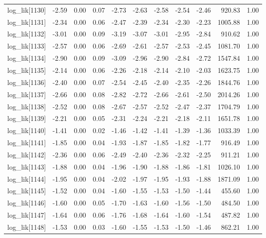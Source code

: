 \begin{table}[ht]
\begin{tabular}{rrrrrrrrrrr}
  log\_lik[1130] & -2.59 & 0.00 & 0.07 & -2.73 & -2.63 & -2.58 & -2.54 & -2.46 & 920.83 & 1.00 \\ 
  log\_lik[1131] & -2.34 & 0.00 & 0.06 & -2.47 & -2.39 & -2.34 & -2.30 & -2.23 & 1005.88 & 1.00 \\ 
  log\_lik[1132] & -3.01 & 0.00 & 0.09 & -3.19 & -3.07 & -3.01 & -2.95 & -2.84 & 910.62 & 1.00 \\ 
  log\_lik[1133] & -2.57 & 0.00 & 0.06 & -2.69 & -2.61 & -2.57 & -2.53 & -2.45 & 1081.70 & 1.00 \\ 
  log\_lik[1134] & -2.90 & 0.00 & 0.09 & -3.09 & -2.96 & -2.90 & -2.84 & -2.72 & 1547.84 & 1.00 \\ 
  log\_lik[1135] & -2.14 & 0.00 & 0.06 & -2.26 & -2.18 & -2.14 & -2.10 & -2.03 & 1623.75 & 1.00 \\ 
  log\_lik[1136] & -2.40 & 0.00 & 0.07 & -2.54 & -2.45 & -2.40 & -2.35 & -2.26 & 1844.76 & 1.00 \\ 
  log\_lik[1137] & -2.66 & 0.00 & 0.08 & -2.82 & -2.72 & -2.66 & -2.61 & -2.50 & 2014.26 & 1.00 \\ 
  log\_lik[1138] & -2.52 & 0.00 & 0.08 & -2.67 & -2.57 & -2.52 & -2.47 & -2.37 & 1704.79 & 1.00 \\ 
  log\_lik[1139] & -2.21 & 0.00 & 0.05 & -2.31 & -2.24 & -2.21 & -2.18 & -2.11 & 1651.78 & 1.00 \\ 
  log\_lik[1140] & -1.41 & 0.00 & 0.02 & -1.46 & -1.42 & -1.41 & -1.39 & -1.36 & 1033.39 & 1.00 \\ 
  log\_lik[1141] & -1.85 & 0.00 & 0.04 & -1.93 & -1.87 & -1.85 & -1.82 & -1.77 & 916.49 & 1.00 \\ 
  log\_lik[1142] & -2.36 & 0.00 & 0.06 & -2.49 & -2.40 & -2.36 & -2.32 & -2.25 & 911.21 & 1.00 \\ 
  log\_lik[1143] & -1.88 & 0.00 & 0.04 & -1.96 & -1.90 & -1.88 & -1.86 & -1.81 & 1026.10 & 1.00 \\ 
  log\_lik[1144] & -1.95 & 0.00 & 0.04 & -2.02 & -1.97 & -1.95 & -1.93 & -1.88 & 1871.09 & 1.00 \\ 
  log\_lik[1145] & -1.52 & 0.00 & 0.04 & -1.60 & -1.55 & -1.53 & -1.50 & -1.44 & 455.60 & 1.00 \\ 
  log\_lik[1146] & -1.60 & 0.00 & 0.05 & -1.70 & -1.63 & -1.60 & -1.56 & -1.50 & 484.50 & 1.00 \\ 
  log\_lik[1147] & -1.64 & 0.00 & 0.06 & -1.76 & -1.68 & -1.64 & -1.60 & -1.54 & 487.82 & 1.00 \\ 
  log\_lik[1148] & -1.53 & 0.00 & 0.03 & -1.60 & -1.55 & -1.53 & -1.50 & -1.46 & 862.21 & 1.00 \\ 

\end{tabular}
\end{table}
